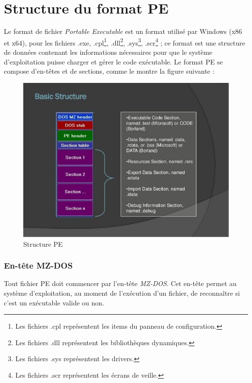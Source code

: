 \section{Structure du format PE} \label{pe_header}
Le format de fichier \emph{Portable Executable} \cite{pe1} est un format utilisé par Windows (x86 et x64), 
pour les fichiers .exe, .cpl\footnote{Les fichiers .cpl représentent les items du panneau de configuration.}, 
.dll\footnote{Les fichiers .dll représentent les bibliothèques dynamiques.}, 
.sys\footnote{Les fichiers .sys représentent les drivers.}, 
.scr\footnote{Les fichiers .scr représentent les écrans de veille.} ;
ce format est une structure de données contenant les 
informations nécessaires pour que le système d’exploitation puisse charger et gérer le code 
exécutable. Le format PE se compose d'en-têtes et de sections, comme le montre la figure suivante : %

\begin{figure}[h]
    \centering
    \includegraphics[scale=0.5]{images/pe_header.jpg}
    \caption{Structure PE}
    \label{structure_pe}
\end{figure}

    \subsubsection{En-tête MZ-DOS}
    Tout fichier PE doit commencer par l'en-tête \emph{MZ-DOS}. Cet en-tête permet au système d'exploitation, au 
    moment de l'exécution d'un fichier, de reconnaître si c'est un exécutable valide ou non. \cite{pe2} %

